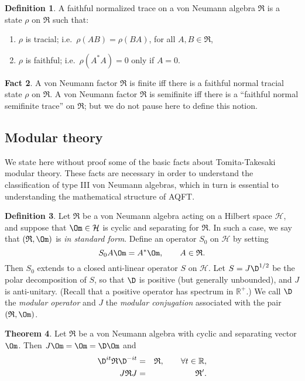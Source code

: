 \documentclass[12pt]{article}
\newcommand{\alg}[1]{\mathfrak{#1}}
\theoremstyle{definition}
\newtheorem{thm}{Theorem}[section]
\newtheorem{fact}[thm]{Fact}
\theoremstyle{definition}
\newtheorem{defn}[thm]{Definition}
\theoremstyle{remark}
\def\2#1{{\mathcal #1}}
\def\7#1{{\mathbb #1}}
\def\al#1{{\mathfrak #1}}
\begin{document}
\begin{defn} A faithful normalized trace on a von Neumann algebra $\alg{R}$ is a
  state $\rho$ on $\alg{R}$ such that:
\begin{enumerate}
\item $\rho$ is tracial; i.e.\ $\rho (AB)=\rho (BA)$, for all $A,B\in \alg{R}$,
\item $\rho$ is faithful; i.e.\ $\rho (A^*A)=0$ only if $A=0$.
\end{enumerate}
\end{defn}

\begin{fact} A von Neumann factor $\alg{R}$ is finite iff there is a
  faithful normal tracial state $\rho$ on $\alg{R}$.  A von Neumann
  factor $\alg{R}$ is semifinite iff there is a ``faithful normal
  semifinite trace'' on $\alg{R}$; but we do not pause here to define
  this notion.  \end{fact}

\subsection{Modular theory} \label{tt}

We state here without proof some of the basic facts about
Tomita-Takesaki modular theory.  These facts are necessary in order to
understand the classification of type III von Neumann algebras, which
in turn is essential to understanding the mathematical structure of
AQFT.  

\begin{defn} Let $\al R$ be a von Neumann algebra acting on a Hilbert
  space $\2H$, and suppose that $\Om \in \2H$ is cyclic and separating
  for $\al R$.  In such a case, we say that $(\al R,\Om )$ is \emph{in
    standard form}.  Define an operator $S_0$ on $\2H$ by setting
  \[ S_0A\Om = A^*\Om ,\qquad A\in \al R .\] Then $S_0$
  extends to a closed anti-linear operator $S$ on
  $\2H$.  Let $S=J\D ^{1/2}$ be the polar decomposition
  of $S$, so that $\D$ is positive (but generally
  unbounded), and $J$ is anti-unitary.  (Recall that a
  positive operator has spectrum in $\7R^+$.)  We call
  $\D$ the \emph{modular operator} and $J$ the
  \emph{modular conjugation} associated with the pair
  $(\al R,\Om )$.  \end{defn}

\begin{thm} Let $\al R$ be a von Neumann algebra with
  cyclic and separating vector $\Om$.  Then $J\Om =\Om
  =\D \Om$ and
  \begin{eqnarray*} \D ^{it}\al R\D ^{-it} &=&
    \al R ,\qquad \forall t\in \7R ,\\
    J\al R J&=&\al R' .\end{eqnarray*} \end{thm}
\end{document}
